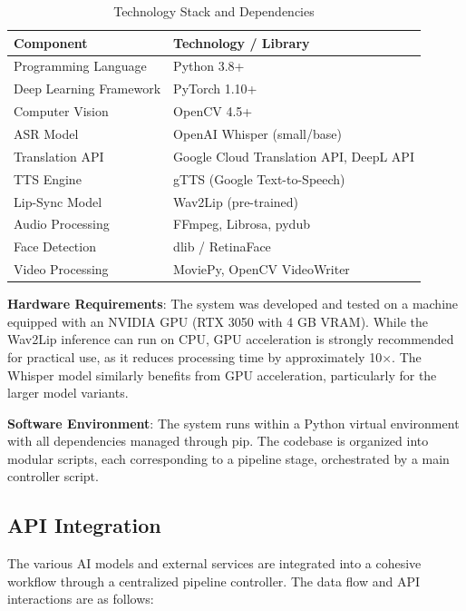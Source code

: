 \documentclass[conference]{IEEEtran}
\begin{document}
\begin{table}[htbp]
\caption{Technology Stack and Dependencies}
\begin{center}
\begin{tabular}{p{2.5cm}p{5cm}}
\toprule
\textbf{Component} & \textbf{Technology / Library} \\
\midrule
Programming Language & Python 3.8+ \\
Deep Learning Framework & PyTorch 1.10+ \\
Computer Vision & OpenCV 4.5+ \\
ASR Model & OpenAI Whisper (small/base) \\
Translation API & Google Cloud Translation API, DeepL API \\
TTS Engine & gTTS (Google Text-to-Speech) \\
Lip-Sync Model & Wav2Lip (pre-trained) \\
Audio Processing & FFmpeg, Librosa, pydub \\
Face Detection & dlib / RetinaFace \\
Video Processing & MoviePy, OpenCV VideoWriter \\
\bottomrule
\end{tabular}
\label{tab:techstack}
\end{center}
\end{table}

\textbf{Hardware Requirements}: The system was developed and tested on a machine equipped with an NVIDIA GPU (RTX 3050 with 4 GB VRAM). While the Wav2Lip inference can run on CPU, GPU acceleration is strongly recommended for practical use, as it reduces processing time by approximately 10$\times$. The Whisper model similarly benefits from GPU acceleration, particularly for the larger model variants.

\textbf{Software Environment}: The system runs within a Python virtual environment with all dependencies managed through pip. The codebase is organized into modular scripts, each corresponding to a pipeline stage, orchestrated by a main controller script.

\subsection{API Integration}

The various AI models and external services are integrated into a cohesive workflow through a centralized pipeline controller. The data flow and API interactions are as follows:
\end{document}

